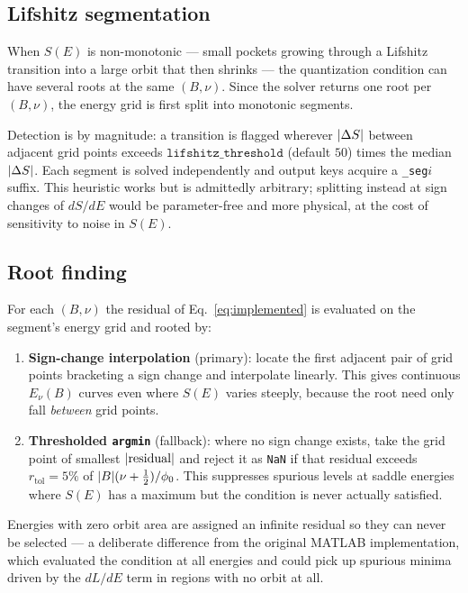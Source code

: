 \documentclass[11pt]{article}
\newcommand{\Bfield}{B}
\newcommand{\code}[1]{\texttt{#1}}
\begin{document}
\subsection{Lifshitz segmentation}

When $S(E)$ is non-monotonic --- small pockets growing through a
Lifshitz transition into a large orbit that then shrinks --- the
quantization condition can have several roots at the same
$(\Bfield,\nu)$.  Since the solver returns one root per $(\Bfield,\nu)$,
the energy grid is first split into monotonic segments.

Detection is by magnitude: a transition is flagged wherever
$\abs{\Delta S}$ between adjacent grid points exceeds
$\texttt{lifshitz\_threshold}$ (default $50$) times the median
$\abs{\Delta S}$.  Each segment is solved independently and output keys
acquire a \code{\_seg}$i$ suffix.  This heuristic works but is
admittedly arbitrary; splitting instead at sign changes of $dS/dE$ would
be parameter-free and more physical, at the cost of sensitivity to noise
in $S(E)$.

\subsection{Root finding}

For each $(\Bfield, \nu)$ the residual of Eq.~\eqref{eq:implemented} is
evaluated on the segment's energy grid and rooted by:
\begin{enumerate}
\item \textbf{Sign-change interpolation} (primary): locate the first
  adjacent pair of grid points bracketing a sign change and interpolate
  linearly.  This gives continuous $E_\nu(\Bfield)$ curves even where
  $S(E)$ varies steeply, because the root need only fall \emph{between}
  grid points.
\item \textbf{Thresholded \code{argmin}} (fallback): where no sign change
  exists, take the grid point of smallest $\abs{\text{residual}}$ and
  reject it as \code{NaN} if that residual exceeds
  $r_{\text{tol}} = 5\%$ of $\abs{\Bfield}(\nu+\tfrac12)/\phi_0$.  This
  suppresses spurious levels at saddle energies where $S(E)$ has a
  maximum but the condition is never actually satisfied.
\end{enumerate}
Energies with zero orbit area are assigned an infinite residual so they
can never be selected --- a deliberate difference from the original
MATLAB implementation, which evaluated the condition at all energies and
could pick up spurious minima driven by the $dL/dE$ term in regions with
no orbit at all.
\end{document}
